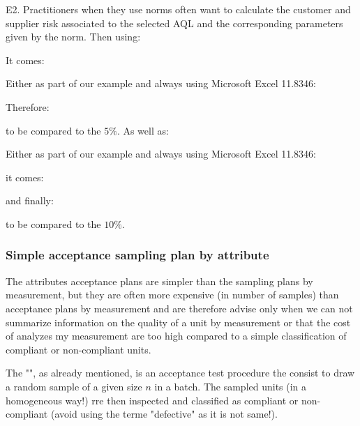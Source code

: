 	\pagebreak
	\begin{tcolorbox}[colframe=black,colback=white,sharp corners]
	E2. Practitioners when they use norms often want to calculate the customer and supplier risk associated to the selected AQL and the corresponding parameters given by the norm. Then using:
	
	It comes:
	
	Either as part of our example and always using Microsoft Excel 11.8346:
	
	Therefore:
	
	to be compared to the $5\%$. As well as:
	
	Either as part of our example and always using Microsoft Excel 11.8346:
	
	it comes:
	
	and finally:
	
	to be compared to the $10\%$.
	\end{tcolorbox}
	
	\pagebreak
	\subsubsection{Simple acceptance sampling plan by attribute}
	The attributes acceptance plans are simpler than the sampling plans by measurement, but they are often more expensive (in number of samples) than acceptance plans by measurement and are therefore advise only when we can not summarize information on the quality of a unit by measurement or that the cost of analyzes my measurement are too high compared to a simple classification of compliant or non-compliant units.

	The "", as already mentioned, is an acceptance test procedure the consist to draw a random sample of a given size $n$ in a batch. The sampled units (in a homogeneous way!) rre then inspected and classified as compliant or non-compliant (avoid using the terme "defective" as it is not same!). 

